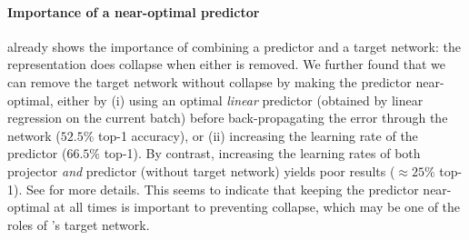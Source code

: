 \paragraph{Importance of a near-optimal predictor}
 already shows the importance of combining a predictor and a target network: the representation does collapse when either is removed. 
We further found that we can remove the target network without collapse by making the predictor near-optimal, either by (i) using an optimal \emph{linear} predictor (obtained by linear regression on the current batch) before back-propagating the error through the network ($52.5\%$ top-1 accuracy), or (ii) increasing the learning rate of the predictor ($66.5\%$ top-1). By contrast, increasing the learning rates of both projector \emph{and} predictor (without target network) yields poor results ($\approx 25\%$ top-1). See  for more details. 
This seems to indicate that keeping the predictor near-optimal at all times is important to preventing collapse, which may be one of the roles of \algo's target network. %










